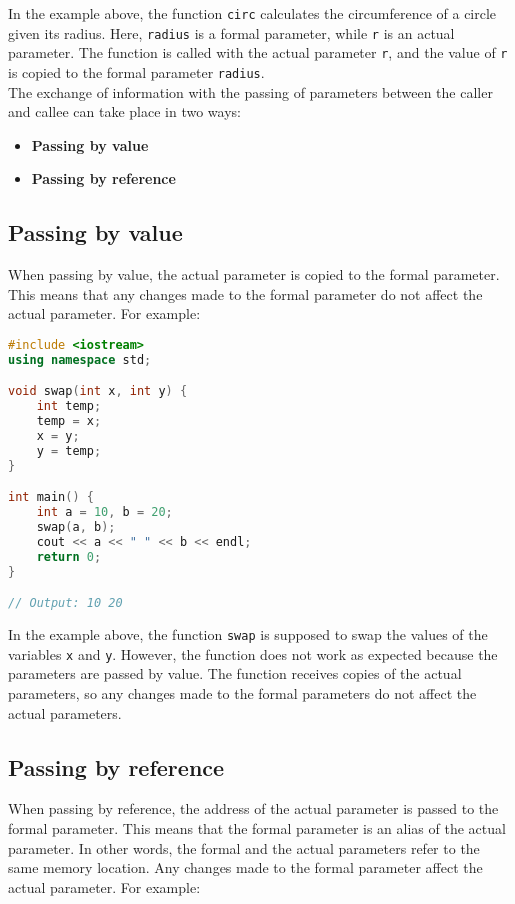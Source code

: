 In the example above, the function \texttt{circ} calculates the circumference of
a circle given its radius. Here, \texttt{radius} is a formal parameter, while
\texttt{r} is an actual parameter. The function is called with the actual
parameter \texttt{r}, and the value of \texttt{r} is copied to the formal
parameter \texttt{radius}.\\

The exchange of information with the passing of parameters between the caller and callee
can take place in two ways:

\begin{itemize}
    \item \textbf{Passing by value}
    \item \textbf{Passing by reference}
\end{itemize}

\subsection{Passing by value}

When passing by value, the actual parameter is copied to the formal parameter.
This means that any changes made to the formal parameter do not affect the 
actual parameter. For example:\\

\begin{lstlisting}[language=C++]
#include <iostream>
using namespace std;

void swap(int x, int y) {
    int temp;
    temp = x;
    x = y;
    y = temp;
}

int main() {
    int a = 10, b = 20;
    swap(a, b);
    cout << a << " " << b << endl;
    return 0;
}

// Output: 10 20
\end{lstlisting}

In the example above, the function \texttt{swap} is supposed to swap the values
of the variables \texttt{x} and \texttt{y}. However, the function does not work
as expected because the parameters are passed by value. The function receives
copies of the actual parameters, so any changes made to the formal parameters do
not affect the actual parameters.

\subsection{Passing by reference}

When passing by reference, the address of the actual parameter is passed to the
formal parameter. This means that the formal parameter is an alias of the actual
parameter. In other words, the formal and the actual parameters refer to the same
memory location. Any changes made to the formal parameter affect the actual
parameter. For example:\\

